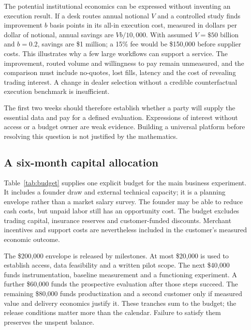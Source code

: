 \documentclass[11pt]{article}
\theoremstyle{remark}\newtheorem{example}{Example}
\begin{document}
The potential institutional economics can be expressed without inventing an
execution result. If a desk routes annual notional $V$ and a controlled study
finds improvement $b$ basis points in its all-in execution cost, measured in
dollars per dollar of notional, annual savings are $Vb/10{,}000$. With assumed
$V=\$50$ billion and $b=0.2$, savings are \$1 million; a 15\% fee would be
\$150,000 before supplier costs. This illustrates why a few large workflows
can support a service. The improvement, routed volume and willingness to pay
remain unmeasured, and the comparison must include no-quotes, lost fills,
latency and the cost of revealing trading interest. A change in dealer
selection without a credible counterfactual execution benchmark is insufficient.

The first two weeks should therefore establish whether a party will supply
the essential data and pay for a defined evaluation. Expressions of interest
without access or a budget owner are weak evidence. Building a universal
platform before resolving this question is not justified by the mathematics.

\subsection{A six-month capital allocation}
Table~\ref{tab:budget} supplies one explicit budget for the main business
experiment. It includes a founder draw and external technical capacity; it is
a planning envelope rather than a market salary survey. The founder may be
able to reduce cash costs, but unpaid labor still has an opportunity cost.
The budget excludes trading capital, insurance reserves and customer-funded
discounts. Merchant incentives and support costs are nevertheless included in
the customer's measured economic outcome.

\begin{table}[htbp]\centering\small

\caption{Illustrative six-month cash budget for one main business pilot and
initial product. No customer revenue is assumed to finance it.}
\label{tab:budget}
\end{table}

The \$200,000 envelope is released by milestones. At most \$20,000 is used
to establish access, data feasibility and a written pilot scope. The next
\$40,000 funds instrumentation, baseline measurement and a functioning
experiment. A further \$60,000 funds the prospective evaluation after those
steps succeed. The remaining \$80,000 funds productization and a second
customer only if measured value and delivery economics justify it. These
tranches sum to the budget; the release conditions matter more than the
calendar. Failure to satisfy them preserves the unspent balance.
\end{document}
